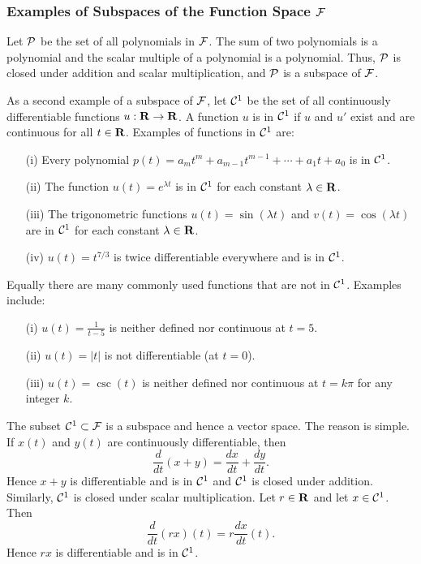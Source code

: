 \documentclass{ximera}
\begin{document}
\subsubsection*{Examples of Subspaces of the Function Space ${\cal F}$}

Let ${\cal P}$ be the set of all polynomials in ${\cal F}$.  The sum of
two polynomials is a polynomial and the scalar multiple of a polynomial is a
polynomial.  Thus, ${\cal P}$ is closed under addition and scalar
multiplication, and ${\cal P}$ is a subspace of ${\cal F}$.

As a second example of a subspace of ${\cal F}$, let ${\cal C}^1$ be the set of
all continuously differentiable functions $u:\mbox{$\bf{R}$}\to\mbox{$\bf{R}$}$.  A function $u$ is
in ${\cal C}^1$ if $u$ and $u'$ exist and are continuous for all $t\in\mbox{$\bf{R}$}$.
Examples of functions in ${\cal C}^1$ are:
\begin{enumerate}
\item[(i)] Every polynomial $p(t)=a_mt^m+a_{m-1}t^{m-1}+\cdots
+a_1t+a_0$ is in ${\cal C}^1$. 
\item[(ii)]  The function $u(t)=e^{\lambda t}$ is in ${\cal C}^1$
for each constant $\lambda\in\mbox{$\bf{R}$}$.
\item[(iii)]  The trigonometric functions $u(t)=\sin(\lambda t)$
and $v(t)=\cos(\lambda t)$ are in ${\cal C}^1$ for each constant
$\lambda\in\mbox{$\bf{R}$}$. 
\item[(iv)] $u(t)=t^{7/3}$ is twice differentiable everywhere and is
in ${\cal C}^1$.
\end{enumerate}
Equally there are many commonly used functions that are not in
${\cal C}^1$.  Examples include:
\begin{enumerate}
\item[(i)] $u(t)=\frac{1}{t-5}$ is neither defined nor
continuous at $t=5$.
\item[(ii)] $u(t)=|t|$ is not differentiable (at $t=0$).
\item[(iii)] $u(t)=\csc(t)$ is neither defined nor continuous at
$t=k\pi$ for any integer $k$.
\end{enumerate}

The subset ${\cal C}^1\subset{\cal F}$  is a subspace and hence a vector space.
The reason is simple.  If $x(t)$ and $y(t)$ are continuously differentiable,
then
\[
\frac{d}{dt}(x+y) = \frac{dx}{dt}+\frac{dy}{dt}.
\]
Hence $x+y$ is differentiable and is in ${\cal C}^1$ and ${\cal C}^1$ is closed under
addition.  Similarly, ${\cal C}^1$ is closed under scalar multiplication.  Let
$r\in\mbox{$\bf{R}$}$ and let $x\in{\cal C}^1$. Then
\[
\frac{d}{dt}(rx)(t) = r\frac{dx}{dt}(t).
\]
Hence $rx$ is differentiable and is in ${\cal C}^1$.
\end{document}

